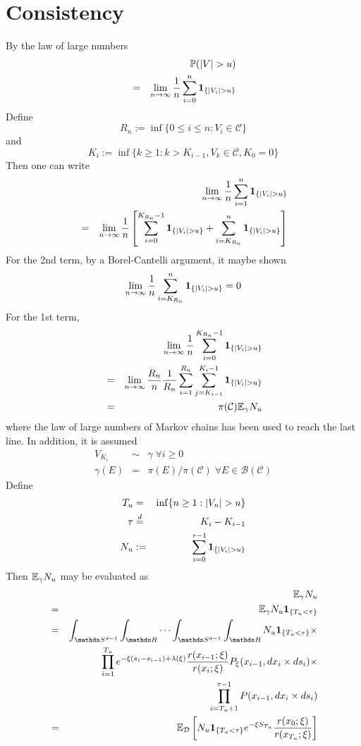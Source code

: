 \documentclass{article}
\theoremstyle{remark}
\begin{document}
\section{Consistency}\label{sec:consistency}
By the law of large numbers
\begin{eqnarray*}
  && \mathbb{P}(|V| > u) \\
  &=& \lim_{n \to \infty} {1 \over n} \sum_{i=0}^n \mathbf{1}_{\{|V_i| > u\}}
\end{eqnarray*}
Define
\[
R_n := \inf\{0 \leq i \leq n: V_i \in \mathcal C\}
\]
and
\[
K_i := \inf\{k \geq 1: k > K_{i-1}, V_k \in \mathcal C, K_0 = 0\}
\]
Then one can write
\begin{eqnarray*}
  && \lim_{n \to \infty} {1 \over n} \sum_{i=1}^n \mathbf{1}_{\{|V_i| > u\}} \\
  &=& \lim_{n \to \infty} {1 \over n} \left[
    \sum_{i=0}^{K_{R_n}-1} \mathbf{1}_{\{|V_i| > u\}} + \sum_{i=K_{R_n}}^n \mathbf{1}_{\{|V_i| > u\}}
\right]
\end{eqnarray*}
For the 2nd term, by a Borel-Cantelli argument, it maybe shown
\[
\lim_{n \to \infty} {1 \over n}\sum_{i=K_{R_n}}^n \mathbf{1}_{\{|V_i| > u\}} = 0
\]
For the 1st term,
\begin{eqnarray*}
&& \lim_{n \to \infty} {1 \over n} \sum_{i=0}^{K_{R_n}-1} \mathbf{1}_{\{|V_i| >
  u\}}  \\
&=& \lim_{n \to \infty} {R_n \over n} {1 \over R_n} \sum_{i=1}^{R_n}
\sum_{j=K_{i-1}}^{K_i-1}\mathbf{1}_{\{|V_i| > u\}} \\
&=& \pi(\mathcal C) \mathbb{E}_\gamma N_u
\end{eqnarray*}
where the law of large numbers of Markov chains has been used to reach
the last line. In addition, it is assumed
\begin{eqnarray*}
  V_{K_i} &\sim& \gamma \; \forall i \geq 0 \\
  \gamma(E) &=& \pi(E)/\pi(\mathcal C)\; \forall E \in \mathcal
  B(\mathcal C)
\end{eqnarray*}
Define
\begin{eqnarray*}
  T_u &=& \inf\{n \geq 1: |V_n| > u\} \\
  \tau &\overset{d}{=}& K_i - K_{i-1} \\
  N_u &:=& \sum_{i=0}^{\tau-1} \mathbf{1}_{\{|V_i| > u\}}  \\
\end{eqnarray*}
Then $\mathbb{E}_\gamma N_u$ may be evaluated as
\begin{eqnarray*}
  && \E_\gamma N_u \\
  &=& \E_\gamma N_u \1{T_u < \tau} \\
  &=& \int_{\mathds S^{d-1}} \int_{\mathds R} \cdots \int_{\mathds
    S^{d-1}} \int_{\mathds R} N_u \1{T_u < \tau} \times \\
  && \prod_{i=1}^{T_u} e^{-\xi(s_i - s_{i-1}) + \lambda(\xi)}
  {r(x_{i-1}; \xi) \over r(x_{i}; \xi)}P_\xi(x_{i-1}, dx_i \times ds_i) \times \\
  && \prod_{i=T_u+1}^{\tau-1} P(x_{i-1}, dx_i \times d s_i) \\
  &=& \E_{\mathcal D} \left[
    N_u \1{T_u < \tau} e^{-\xi S_{T_u}} {r(x_0; \xi)
      \over r(x_{T_u}; \xi)}
  \right]
\end{eqnarray*}
\end{document}
